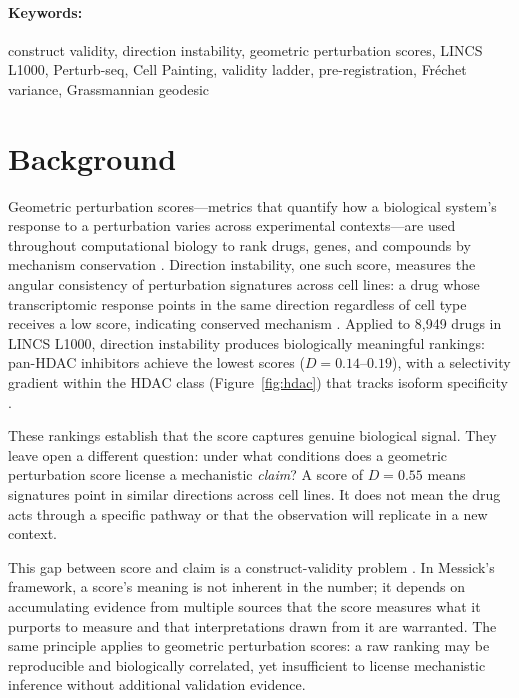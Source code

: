 \documentclass[11pt]{article}
\begin{document}
\paragraph{Keywords:} construct validity, direction instability, geometric perturbation scores, LINCS L1000, Perturb-seq, Cell Painting, validity ladder, pre-registration, Fr\'{e}chet variance, Grassmannian geodesic

\section{Background}

Geometric perturbation scores---metrics that quantify how a biological
system's response to a perturbation varies across experimental
contexts---are used throughout computational biology to rank drugs, genes,
and compounds by mechanism conservation
\citep{lamb2006connectivity,subramanian2017next}. Direction instability,
one such score, measures the angular consistency of perturbation signatures
across cell lines: a drug whose transcriptomic response points in the same
direction regardless of cell type receives a low score, indicating conserved
mechanism \citep{tower2026drug}. Applied to 8{,}949 drugs in LINCS L1000,
direction instability produces biologically meaningful rankings: pan-HDAC
inhibitors achieve the lowest scores ($D = 0.14$--$0.19$), with a
selectivity gradient within the HDAC class (Figure~\ref{fig:hdac})
that tracks isoform specificity \citep{tower2026atlas}.

These rankings establish that the score captures genuine biological signal.
They leave open a different question: under what conditions does a
geometric perturbation score license a mechanistic \emph{claim}? A score
of $D = 0.55$ means signatures point in similar directions across cell
lines. It does not mean the drug acts through a specific pathway or that
the observation will replicate in a new context.

This gap between score and claim is a construct-validity problem
\citep{cronbach1955construct,messick1995validity}. In Messick's framework,
a score's meaning is
not inherent in the number; it depends on accumulating evidence from
multiple sources that the score measures what it purports to measure and
that interpretations drawn from it are warranted. The same principle
applies to geometric perturbation scores: a raw ranking may be
reproducible and biologically correlated, yet insufficient to license
mechanistic inference without additional validation evidence.
\end{document}
